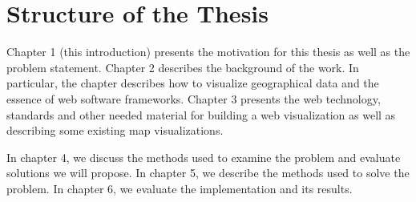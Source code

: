\section{Structure of the Thesis}
\label{section:structure} 

 Chapter 1 (this introduction) presents the motivation for this thesis as well as the problem statement. Chapter 2 describes the background of the work. In particular, the chapter describes how to visualize geographical data and the essence of web software frameworks. Chapter 3 presents the web technology, standards and other needed material for building a web visualization as well as describing some existing map visualizations.

In chapter 4, we discuss the methods used to examine the problem and evaluate solutions we will propose. In chapter 5, we describe the methods used to solve the problem. In chapter 6, we evaluate the implementation and its results. 



